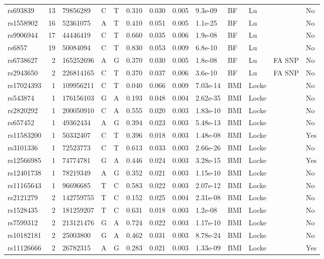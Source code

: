 \documentclass[11pt,twoside]{bristolthesis}
\begin{document}
\begin{longtable}[t]{lrlllrrrlllll}
rs693839 & 13 & 79856289 & C & T & 0.310 & 0.030 & 0.005 & 9.3e-09 & BF & Lu &  & No\\
rs1558902 & 16 & 52361075 & A & T & 0.410 & 0.051 & 0.005 & 1.1e-25 & BF & Lu &  & No\\
rs9906944 & 17 & 44446419 & C & T & 0.660 & 0.035 & 0.006 & 1.9e-08 & BF & Lu &  & No\\
\addlinespace
rs6857 & 19 & 50084094 & C & T & 0.830 & 0.053 & 0.009 & 6.8e-10 & BF & Lu &  & No\\
rs6738627 & 2 & 165252696 & A & G & 0.370 & 0.030 & 0.005 & 1.8e-08 & BF & Lu & FA SNP & No\\
rs2943650 & 2 & 226814165 & C & T & 0.370 & 0.037 & 0.006 & 3.6e-10 & BF & Lu & FA SNP & No\\
rs17024393 & 1 & 109956211 & C & T & 0.040 & 0.066 & 0.009 & 7.03e-14 & BMI & Locke &  & No\\
rs543874 & 1 & 176156103 & G & A & 0.193 & 0.048 & 0.004 & 2.62e-35 & BMI & Locke &  & No\\
\addlinespace
rs2820292 & 1 & 200050910 & C & A & 0.555 & 0.020 & 0.003 & 1.83e-10 & BMI & Locke &  & No\\
rs657452 & 1 & 49362434 & A & G & 0.394 & 0.023 & 0.003 & 5.48e-13 & BMI & Locke &  & No\\
rs11583200 & 1 & 50332407 & C & T & 0.396 & 0.018 & 0.003 & 1.48e-08 & BMI & Locke &  & Yes\\
rs3101336 & 1 & 72523773 & C & T & 0.613 & 0.033 & 0.003 & 2.66e-26 & BMI & Locke &  & No\\
rs12566985 & 1 & 74774781 & G & A & 0.446 & 0.024 & 0.003 & 3.28e-15 & BMI & Locke &  & Yes\\
\addlinespace
rs12401738 & 1 & 78219349 & A & G & 0.352 & 0.021 & 0.003 & 1.15e-10 & BMI & Locke &  & No\\
rs11165643 & 1 & 96696685 & T & C & 0.583 & 0.022 & 0.003 & 2.07e-12 & BMI & Locke &  & No\\
rs2121279 & 2 & 142759755 & T & C & 0.152 & 0.025 & 0.004 & 2.31e-08 & BMI & Locke &  & No\\
rs1528435 & 2 & 181259207 & T & C & 0.631 & 0.018 & 0.003 & 1.2e-08 & BMI & Locke &  & No\\
rs7599312 & 2 & 213121476 & G & A & 0.724 & 0.022 & 0.003 & 1.17e-10 & BMI & Locke &  & No\\
\addlinespace
rs10182181 & 2 & 25003800 & G & A & 0.462 & 0.031 & 0.003 & 8.78e-24 & BMI & Locke &  & No\\
rs11126666 & 2 & 26782315 & A & G & 0.283 & 0.021 & 0.003 & 1.33e-09 & BMI & Locke &  & Yes\\

\end{longtable}
\end{document}
